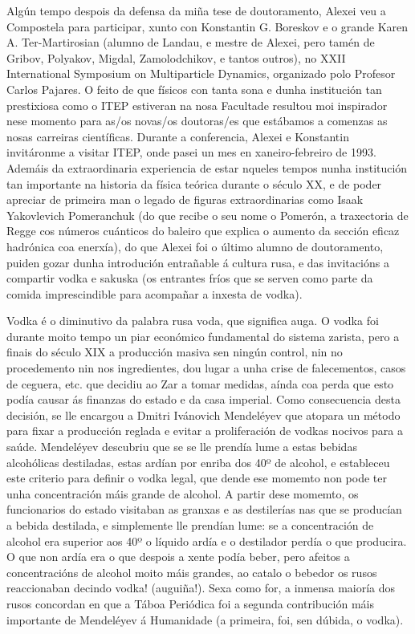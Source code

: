 \begin{refsection}
\begin{multicols}{2}
Algún tempo despois da defensa da miña tese de doutoramento, Alexei veu a Compostela para participar, xunto con Konstantin G. Boreskov e o grande Karen A. Ter-Martirosian (alumno de Landau, e mestre de Alexei, pero tamén de Gribov, Polyakov, Migdal, Zamolodchikov, e tantos outros), no XXII International Symposium on Multiparticle Dynamics, organizado polo Profesor Carlos Pajares. O feito de que físicos con tanta sona e dunha institución tan prestixiosa como o ITEP estiveran na nosa Facultade resultou moi inspirador nese momento para as/os novas/os doutoras/es que estábamos a comenzas as nosas carreiras científicas. Durante a conferencia, Alexei e Konstantin invitáronme a visitar  ITEP, onde pasei un mes en xaneiro-febreiro de 1993. Ademáis da extraordinaria experiencia de estar nqueles tempos nunha institución tan importante na historia da física teórica durante o século XX, e de poder apreciar de primeira man o legado de figuras extraordinarias como Isaak Yakovlevich Pomeranchuk (do que recibe o seu nome o Pomerón, a traxectoria de Regge cos números cuánticos do baleiro que explica o aumento da sección eficaz hadrónica coa enerxía), do que Alexei foi o último alumno de doutoramento, puiden gozar dunha introdución entrañable á cultura rusa, e das invitacións a compartir vodka e sakuska (os entrantes fríos que se serven como parte da comida imprescindible para acompañar a inxesta de vodka).

Vodka é o diminutivo da palabra rusa voda, que significa auga. O vodka foi durante moito tempo un piar económico fundamental do sistema zarista, pero a finais do século XIX a producción masiva sen ningún control, nin no procedemento nin nos ingredientes, dou lugar a unha crise de falecementos, casos de ceguera, etc. que decidiu ao Zar a tomar medidas, aínda coa perda que esto podía causar ás finanzas do estado e da casa imperial. Como consecuencia desta decisión, se lle encargou a Dmitri Ivánovich Mendeléyev que atopara un método para fixar a producción reglada e evitar a proliferación de vodkas nocivos para a saúde. Mendeléyev descubriu que se se lle prendía lume a estas bebidas alcohólicas destiladas, estas ardían por enriba dos 40º de alcohol, e estableceu este criterio para definir o vodka legal, que dende ese momemto non pode ter unha concentración máis grande de alcohol. A partir dese momemto, os funcionarios do estado visitaban as granxas e as destilerías nas que se producían a bebida destilada, e simplemente lle prendían lume: se a concentración de alcohol era superior aos 40º o líquido ardía e o destilador perdía o que producira. O que non ardía era o que despois a xente podía beber, pero afeitos a concentracións de alcohol moito máis grandes, ao catalo o bebedor os rusos reaccionaban decindo vodka! (auguiña!). Sexa como for, a inmensa maioría dos rusos concordan en que a Táboa Periódica foi a segunda contribución máis importante de Mendeléyev á Humanidade (a primeira, foi, sen dúbida, o vodka).


\end{multicols}
\end{refsection}
